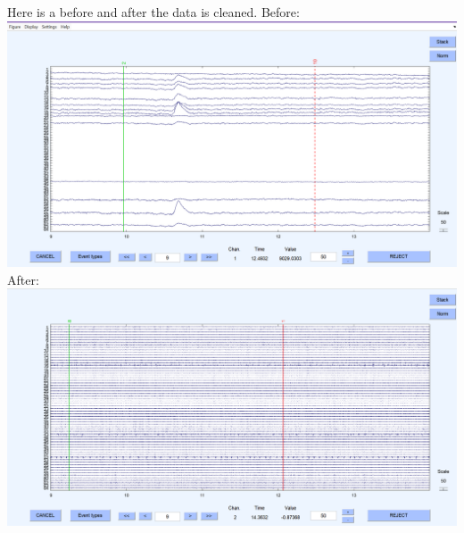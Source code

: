 \documentclass[12pt]{article}
\begin{document}
Here is a before and after the data is cleaned.\newline
Before:  \includegraphics[scale=0.4]{Subject11r1before}\newline
After:  \includegraphics[scale=0.4]{Subject11r1after}\newline
\end{document}

